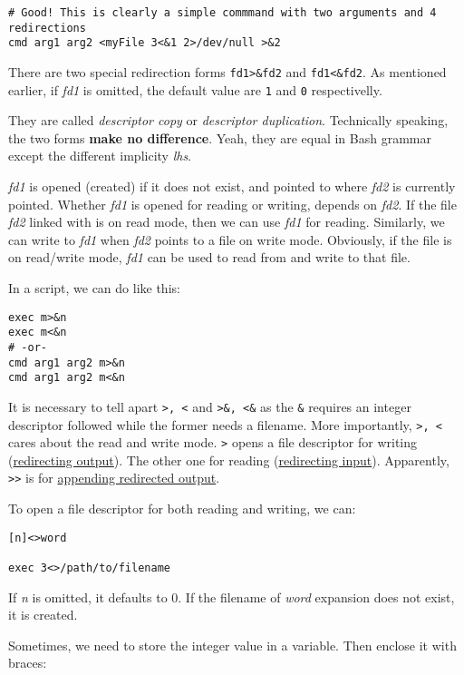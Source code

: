 \begin{lstlisting}
# Good! This is clearly a simple commmand with two arguments and 4 redirections
cmd arg1 arg2 <myFile 3<&1 2>/dev/null >&2
\end{lstlisting}

There are two special redirection forms \lstinline|fd1>&fd2| and
\lstinline|fd1<&fd2|. As mentioned earlier, if \textit{fd1} is
omitted, the default value are \verb|1| and \verb|0|
respectivelly.

They are called \textit{descriptor copy} or \textit{descriptor
  duplication}. Technically speaking, the two forms \textbf{make no
  difference}. Yeah, they are equal in Bash grammar except the
different implicity \textit{lhs}.

\textit{fd1} is opened (created) if it does not exist, and pointed
to where \textit{fd2} is currently pointed. Whether \textit{fd1}
is opened for reading or writing, depends on \textit{fd2}. If the
file \textit{fd2} linked with is on read mode, then we can use
\textit{fd1} for reading. Similarly, we can write to \textit{fd1}
when \textit{fd2} points to a file on write mode. Obviously, if
the file is on read/write mode, \textit{fd1} can be used to read
from and write to that file.

In a script, we can do like this:

\begin{lstlisting}
exec m>&n
exec m<&n
# -or-
cmd arg1 arg2 m>&n
cmd arg1 arg2 m<&n
\end{lstlisting}

It is necessary to tell apart \verb|>, <| and \verb|>&, <&| as the
\verb|&| requires an integer descriptor followed while the former
needs a filename. More importantly, \verb|>, <| cares about the
read and write mode. \verb|>| opens a file descriptor for writing
(\uline{redirecting output}). The other one for reading
(\uline{redirecting input}). Apparently, \verb|>>| is for
\uline{appending redirected output}.

To open a file descriptor for both reading and
writing, we can:

\begin{lstlisting}
[n]<>word

exec 3<>/path/to/filename
\end{lstlisting}

If \textit{n} is omitted, it defaults to 0. If the filename of
\textit{word} expansion does not exist, it is created.

Sometimes, we need to store the integer value in a variable. Then
enclose it with braces:

